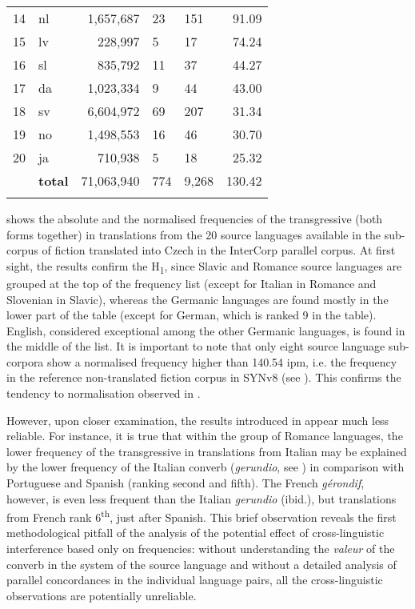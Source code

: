 \documentclass[output=paper,russian]{langsci/langscibook}
\begin{document}
\begin{table}[b]
\begin{tabularx}{\textwidth}{XXrYYr}
    14    & nl        & 1,657,687     & 23        & 151     & 91.09\\
    15    & lv        & 228,997       & 5         & 17      & 74.24\\
    16    & sl        & 835,792       & 11        & 37      & 44.27\\
    17    & da        & 1,023,334     & 9         & 44      & 43.00\\
    18    & sv        & 6,604,972     & 69        & 207     & 31.34\\
    19    & no        & 1,498,553     & 16        & 46      & 30.70\\
    20    & ja        & 710,938       & 5         & 18      & 25.32\\
    \midrule
          & \textbf{total}     & 71,063,940    & 774       & 9,268   & 130.42\\
    \lspbottomrule
  \end{tabularx}
\end{table}


 shows the absolute and the normalised frequencies of the transgressive (both forms together) in translations from the 20 source languages available in the sub-corpus of fiction translated into Czech in the InterCorp parallel corpus. At first sight, the results confirm the H\textsubscript{1}, since Slavic and Romance source languages are grouped at the top of the frequency list (except for Italian in Romance and Slovenian in Slavic), whereas the Germanic languages are found mostly in the lower part of the table (except for German, which is ranked 9 in the table). English, considered exceptional among the other Germanic languages, is found in the middle of the list. It is important to note that only eight source language sub-corpora show a normalised frequency higher than 140.54 ipm, i.e. the frequency in the reference non-translated fiction corpus in SYNv8 (see ). This confirms the tendency to normalisation observed in .

However, upon closer examination, the results introduced in  appear much less reliable. For instance, it is true that within the group of Romance languages, the lower frequency of the transgressive in translations from Italian may be explained by the lower frequency of the Italian converb (\textit{gerundio}, see \cite{ceretal20}) in comparison with Portuguese and Spanish (ranking second and fifth). The French \textit{gérondif}, however, is even less frequent than the Italian \textit{gerundio} (ibid.), but translations from French rank 6\textsuperscript{th}, just after Spanish. This brief observation reveals the first methodological pitfall of the analysis of the potential effect of cross-linguistic interference based only on frequencies: without understanding the \textit{valeur} of the converb in the system of the source language and without a detailed analysis of parallel concordances in the individual language pairs, all the cross-linguistic observations are potentially unreliable.
\end{document}
